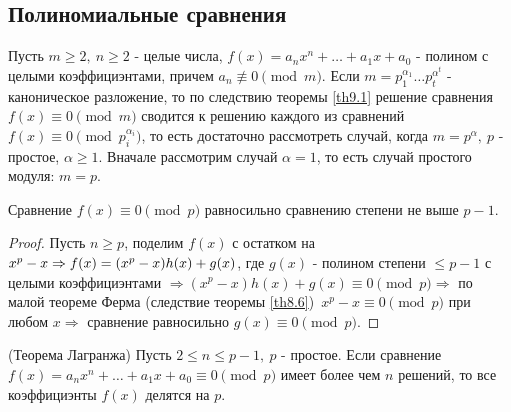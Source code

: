     \subsection*{Полиномиальные сравнения}
    Пусть $m\geq 2,\ n\geq 2$ - целые числа, $f(x)=a_n x^n+\dots+a_1 x+a_0$ - полином с целыми коэффициэнтами, причем $a_n\not\equiv 0\pmod{m}$. Если $m=p_1^{\alpha_1}\dots p_t^{\alpha^t}$ - каноническое разложение, то по следствию теоремы \ref{th9.1} решение сравнения\\
    $f(x)\equiv 0\pmod{m}$ сводится к решению каждого из сравнений $f(x)\equiv 0\pmod{p_i^{\alpha_i}}$, то есть достаточно рассмотреть случай, когда $m=p^{\alpha},\ p$ - простое, $\alpha\geq 1$. Вначале рассмотрим случай $\alpha=1$, то есть случай простого модуля: $m=p$.
    \begin{theorem}\label{th9.4}
        Сравнение $f(x)\equiv 0\pmod{p}$ равносильно сравнению степени не выше $p-1$.
    \end{theorem} 
    \begin{proof}
        Пусть $n\geq p$, поделим $f(x)$ с остатком на $x^p-x\\
        \Rightarrow f(x)=(x^p-x)h(x)+g(x)$, где $g(x)$ - полином степени $\leq p-1$ с целыми коэффициэнтами $\Rightarrow (x^p-x)h(x)+g(x)\equiv 0\pmod{p} \Rightarrow$ по малой теореме Ферма (следствие теоремы \ref{th8.6})\ $x^p-x\equiv 0 \pmod{p}$ при любом $x \Rightarrow$ сравнение равносильно $g(x)\equiv 0\pmod{p}$.
    \end{proof} 
    \begin{theorem} (Теорема Лагранжа) \label{th9.5}
        Пусть $2\leq n\leq p-1,\ p$ - простое. Если сравнение $f(x)=a_n x^n+\dots+a_1 x+a_0\equiv 0\pmod{p}$ имеет более чем $n$ решений, то все коэффициэнты $f(x)$ делятся на $p$.
    \end{theorem} 
